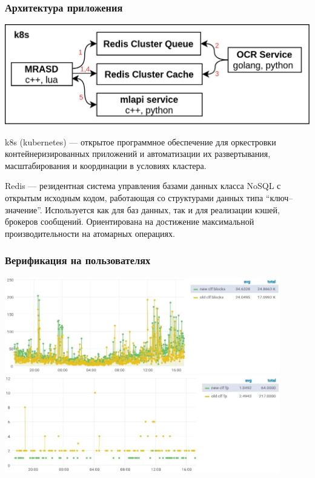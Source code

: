 \documentclass[compress,professionalfont]{beamer}
\begin{document}
\begin{frame}
\frametitle{Архитектура приложения}

\begin{center}
\includegraphics[width=.8\textwidth]{architecture.jpg}
\end{center}

k8s (kubernetes) --- открытое программное обеспечение для оркестровки контейнеризированных приложений и автоматизации их развертывания, масштабирования и координации в условиях кластера.

Redis --- резидентная система управления базами данных класса NoSQL с открытым исходным кодом, работающая со структурами данных типа ``ключ--значение''. Используется как для баз данных, так и для реализации кэшей, брокеров сообщений. Ориентирована на достижение максимальной производительности на атомарных операциях.

\end{frame}

\begin{frame}
\frametitle{Верификация на пользователях}

\begin{center}
\includegraphics[width=0.9\textwidth]{old_vs_new_ps.jpg}
\includegraphics[width=0.9\textwidth]{old_vs_new_fp.jpg}
\end{center}

\end{frame}
\end{document}
